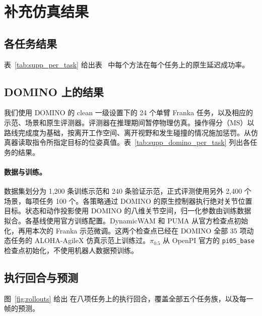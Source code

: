 \section{补充仿真结果}
\label{app:results}

\subsection{各任务结果}
\label{app:per_task}
表~\ref{tab:supp_per_task} 给出表~ 中每个方法在每个任务上的原生延迟成功率。



\subsection{DOMINO 上的结果}
\label{app:external}
我们使用 DOMINO \cite{domino} 的 clean 一级设置下的 24 个单臂 Franka 任务，以及相应的示范、场景和原生评测器。评测器在推理期间暂停物理仿真。操作得分（MS）以路线完成度为基础，按离开工作空间、离开视野和发生碰撞的情况施加惩罚。\ours 从仿真器读取指令所指定目标的位姿真值。表~\ref{tab:supp_domino_per_task} 列出各任务的结果。

\paragraph{数据与训练。}
数据集划分为 1{,}200 条训练示范和 240 条验证示范，正式评测使用另外 2{,}400 个场景，每项任务 100 个。各策略通过 DOMINO 的原生控制器执行绝对关节位置目标。状态和动作投影使用 DOMINO 的八维关节空间，归一化参数由训练数据拟合。各基线使用官方训练配置。DynamicWAM 和 PUMA 从官方检查点初始化，再用本次的 Franka 示范微调。这两个检查点已经在 DOMINO 全部 35 项动态任务的 ALOHA-AgileX 仿真示范上训练过。$\pi_{0.5}$ 从 OpenPI 官方的 \texttt{pi05\_base} 检查点初始化，\ours 不使用机器人数据预训练。



\subsection{执行回合与预测}
\label{app:prediction}
图~\ref{fig:rollouts} 给出 \ours 在八项任务上的执行回合，覆盖全部五个任务族，以及每一帧的预测。

